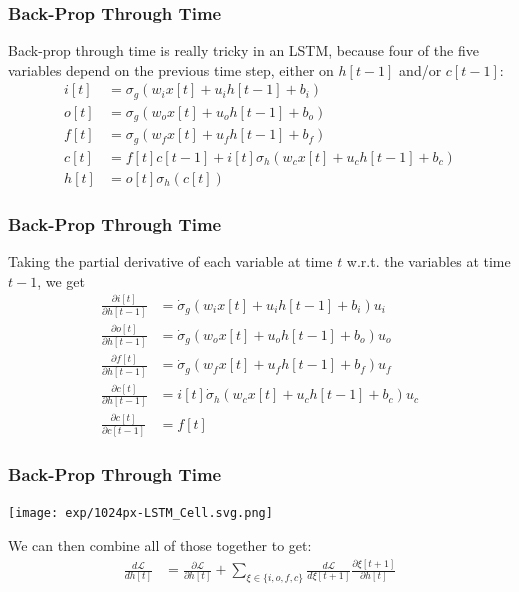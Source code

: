 \documentclass{beamer}
\begin{document}
\begin{frame}
  \frametitle{Back-Prop Through Time}
  Back-prop through time is really tricky in an LSTM, because four of the five
  variables depend on the previous time step, either on $h[t-1]$ and/or $c[t-1]$:
  \begin{align*}
    i[t] &=\sigma_g(w_i x[t]+u_i h[t-1]+b_i)\\
    o[t] &=\sigma_g(w_o x[t]+u_o h[t-1]+b_o)\\
    f[t] &=\sigma_g(w_f x[t]+u_f h[t-1]+b_f)\\
    c[t] &=f[t]c[t-1]+i[t]\sigma_h\left(w_cx[t]+u_ch[t-1]+b_c\right)\\
    h[t] &=o[t]\sigma_h(c[t])
  \end{align*}
\end{frame}

\begin{frame}
  \frametitle{Back-Prop Through Time}

  Taking the partial derivative of each variable at time $t$
  w.r.t. the variables at time $t-1$, we get
  \begin{align*}
    \frac{\partial i[t]}{\partial h[t-1]}
    &=\dot\sigma_g(w_i x[t]+u_i h[t-1]+b_i)u_i\\
    \frac{\partial o[t]}{\partial h[t-1]}
    &=\dot\sigma_g(w_o x[t]+u_o h[t-1]+b_o)u_o\\
    \frac{\partial f[t]}{\partial h[t-1]}
    &=\dot\sigma_g(w_f x[t]+u_f h[t-1]+b_f)u_f\\
    \frac{\partial c[t]}{\partial h[t-1]}
    &=i[t]\dot\sigma_h\left(w_cx[t]+u_ch[t-1]+b_c\right)u_c\\
    \frac{\partial c[t]}{\partial c[t-1]}
    &=f[t]
  \end{align*}
\end{frame}

\begin{frame}
  \frametitle{Back-Prop Through Time}

  \centerline{\texttt{[image: exp/1024px-LSTM\_Cell.svg.png]}}

  We can then combine all of those together to get:
  \begin{align*}
    \frac{d{\mathcal L}}{d h[t]}
    &= \frac{\partial{\mathcal L}}{\partial h[t]} +
    \sum_{\xi\in\{i,o,f,c\}}\frac{d{\mathcal L}}{d\xi[t+1]}
    \frac{\partial\xi[t+1]}{\partial h[t]}
  \end{align*}
\end{frame}
\end{document}
